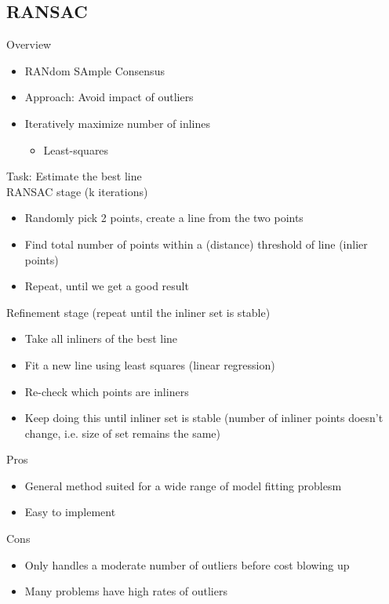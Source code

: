 \subsection{RANSAC}
Overview
\begin{itemize}
    \item RANdom SAmple Consensus
    \item Approach: Avoid impact of outliers
    \item Iteratively maximize number of inlines
    \begin{itemize}
        \item Least-squares
    \end{itemize}
\end{itemize}
Task: Estimate the best line\\
RANSAC stage (k iterations)
\begin{itemize}
    \item Randomly pick 2 points, create a line from the two points
    \item Find total number of points within a (distance) threshold of line (inlier points)
    \item Repeat, until we get a good result
\end{itemize}
Refinement stage (repeat until the inliner set is stable)
\begin{itemize}
    \item Take all inliners of the best line
    \item Fit a new line using least squares (linear regression)
    \item Re-check which points are inliners
    \item Keep doing this until inliner set is stable (number of inliner points doesn't change, i.e. size of set remains the same)
\end{itemize}
Pros
\begin{itemize}
    \item General method suited for a wide range of model fitting problesm
    \item Easy to implement
\end{itemize}
Cons
\begin{itemize}
    \item Only handles a moderate number of outliers before cost blowing up
    \item Many problems have high rates of outliers
\end{itemize}

